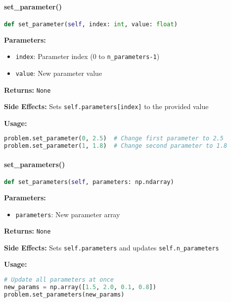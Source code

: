\paragraph{set\_parameter()}
\begin{lstlisting}[language=Python, caption=Set Parameter Method]
def set_parameter(self, index: int, value: float)
\end{lstlisting}

\textbf{Parameters:}
\begin{itemize}
    \item \texttt{index}: Parameter index (0 to \texttt{n\_parameters-1})
    \item \texttt{value}: New parameter value
\end{itemize}

\textbf{Returns:} \texttt{None}

\textbf{Side Effects:} Sets \texttt{self.parameters[index]} to the provided value

\textbf{Usage:}
\begin{lstlisting}[language=Python, caption=Set Parameter Usage]
problem.set_parameter(0, 2.5)  # Change first parameter to 2.5
problem.set_parameter(1, 1.8)  # Change second parameter to 1.8
\end{lstlisting}

\paragraph{set\_parameters()}
\begin{lstlisting}[language=Python, caption=Set Parameters Method]
def set_parameters(self, parameters: np.ndarray)
\end{lstlisting}

\textbf{Parameters:}
\begin{itemize}
    \item \texttt{parameters}: New parameter array
\end{itemize}

\textbf{Returns:} \texttt{None}

\textbf{Side Effects:} Sets \texttt{self.parameters} and updates \texttt{self.n\_parameters}

\textbf{Usage:}
\begin{lstlisting}[language=Python, caption=Set Parameters Usage]
# Update all parameters at once
new_params = np.array([1.5, 2.0, 0.1, 0.8])
problem.set_parameters(new_params)
\end{lstlisting}

